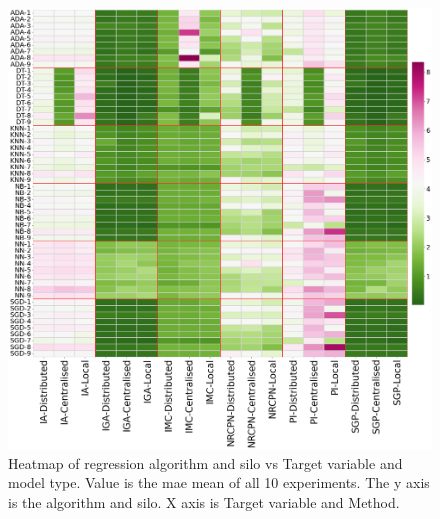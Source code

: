 \begin{figure}[htbp]
\centering
\captionsetup{justification=centering}

\caption{Heatmap of regression algorithm and silo vs Target variable and model type. Value is the \ac{mae} mean of all 10 experiments. The y axis is the algorithm and silo. X axis is Target variable and Method.}\label{fig:heatmpa-int} 
\includegraphics[scale=0.22]{figures/heatmap-reg.png}
\end{figure}


